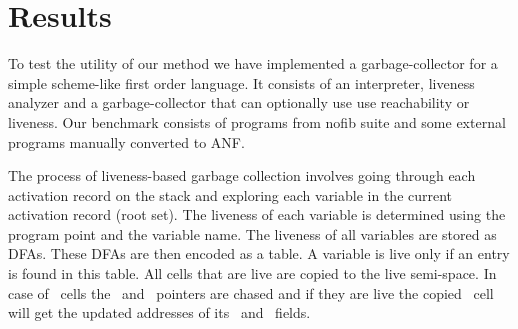 \documentclass[9pt]{sigplanconf}
\newcommand{\comment}[1]{{\color{Myblue}{(#1)}}}
\begin{document}
\section{Results}

To test the utility of our method we have implemented a garbage-collector 
for a simple scheme-like first order language. It consists of an interpreter, 
liveness analyzer and a garbage-collector that can optionally use use reachability or liveness. 
Our benchmark consists of programs from nofib suite and some external programs manually converted to ANF. 


The process of liveness-based garbage collection involves going through 
each activation record on the stack and exploring each variable in the 
current activation record (root set). The liveness of each variable is 
determined using the program point and the variable name. The liveness 
of all variables are stored as DFAs. These DFAs are then encoded as a 
table. A variable is live only if an entry is found in this table.
All cells that are live are copied to the live semi-space. In case of 
\CONS\ cells the \CAR\ and \CDR\ pointers are chased and if they are 
live the copied \CONS\ cell will get the updated addresses of its 
\CAR\ and \CDR\ fields.
\end{document}
